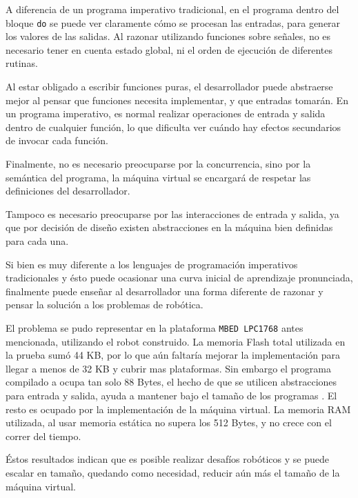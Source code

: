   A diferencia de un programa imperativo tradicional, en el programa
\frob{} dentro del bloque \texttt{do} se puede ver claramente cómo
se procesan las entradas, para generar los valores de las salidas.
  Al razonar utilizando funciones sobre señales, no es necesario
tener en cuenta estado global, ni el orden de ejecución de
diferentes rutinas.

  Al estar obligado a escribir funciones puras, el desarrollador
puede abstraerse mejor al pensar que funciones necesita implementar,
y que entradas tomarán. En un programa imperativo, es normal realizar
operaciones de entrada y salida dentro de cualquier función, lo que
dificulta ver cuándo hay efectos secundarios de invocar cada función.

  Finalmente, no es necesario preocuparse por la concurrencia, sino
por la semántica del programa, la máquina virtual se encargará de
respetar las definiciones del desarrollador.

  Tampoco es necesario preocuparse por las interacciones de entrada
y salida, ya que por decisión de diseño existen abstracciones en
la máquina bien definidas para cada una.

  Si bien \frob{} es muy diferente a los lenguajes de
programación imperativos tradicionales y ésto puede ocasionar una
curva inicial de aprendizaje pronunciada, finalmente puede enseñar al
desarrollador una forma diferente de razonar y pensar la solución
a los problemas de robótica.

  El problema se pudo representar en la plataforma \texttt{MBED LPC1768} antes
mencionada, utilizando el robot construido.
  La memoria Flash total utilizada en la prueba sumó 44 KB, por lo que
aún faltaría mejorar la implementación para llegar a menos de 32 KB y
cubrir mas plataformas.
  Sin embargo el programa \frob{} compilado a \alf{} ocupa tan solo 88 Bytes,
el hecho de que se utilicen abstracciones para entrada y salida, ayuda a mantener
bajo el tamaño de los programas \alf{}. El resto es ocupado por la implementación de
la máquina virtual.
  La memoria RAM utilizada, al usar memoria estática no supera los 512 Bytes, y no
crece con el correr del tiempo.

  Éstos resultados indican que es posible realizar desafíos robóticos y se puede
escalar en tamaño, quedando como necesidad, reducir aún más el tamaño de la
máquina virtual.
